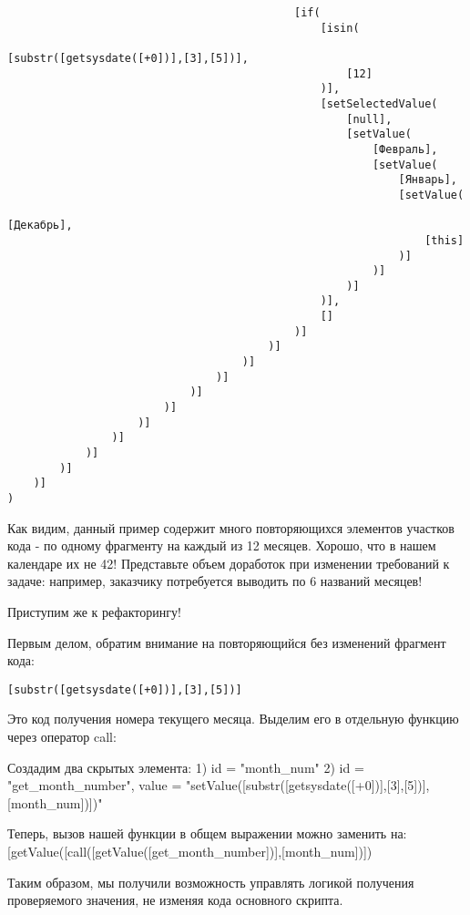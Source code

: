 \documentclass[10pt]{book}
\begin{document}
\begin{verbatim}
                                            [if(
                                                [isin(
                                                    [substr([getsysdate([+0])],[3],[5])],
                                                    [12]
                                                )],
                                                [setSelectedValue(
                                                    [null],
                                                    [setValue(
                                                        [Февраль],
                                                        [setValue(
                                                            [Январь],
                                                            [setValue(
                                                                [Декабрь],
                                                                [this]
                                                            )]
                                                        )]
                                                    )]
                                                )],
                                                []
                                            )]
                                        )]
                                    )]
                                )]
                            )]
                        )]
                    )]
                )]
            )]
        )]
    )]
)
\end{verbatim}

Как видим, данный пример содержит много повторяющихся элементов участков кода - по одному фрагменту на каждый из 12 месяцев. Хорошо, что в нашем календаре их не 42! Представьте объем доработок при изменении требований к задаче: например, заказчику потребуется выводить по 6 названий месяцев!

Приступим же к рефакторингу!

Первым делом, обратим внимание на повторяющийся без изменений фрагмент кода:

\begin{verbatim}
[substr([getsysdate([+0])],[3],[5])]
\end{verbatim}

Это код получения номера текущего месяца. Выделим его в отдельную функцию через оператор call:

Создадим два скрытых элемента:
1) id = "month_num"
2) id = "get_month_number", value = "setValue([substr([getsysdate([+0])],[3],[5])],[month_num])])" 

Теперь, вызов нашей функции в общем выражении можно заменить на:
[getValue([call([getValue([get_month_number])],[month_num])])

Таким образом, мы получили возможность управлять логикой получения проверяемого значения, не изменяя кода основного скрипта.
\end{document}
